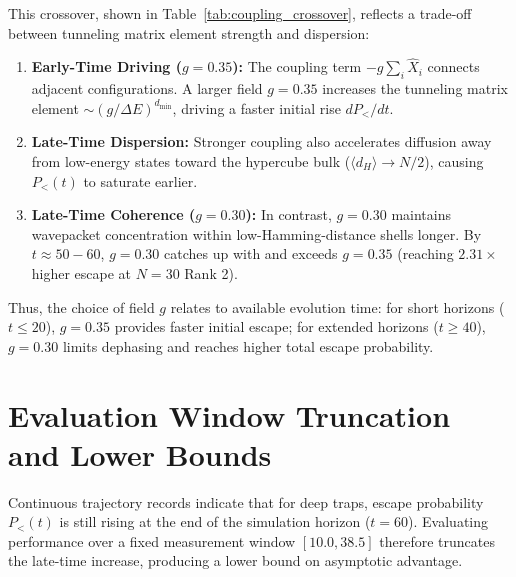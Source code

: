 \documentclass[12pt,a4paper]{report}
\begin{document}
This crossover, shown in Table~\ref{tab:coupling_crossover}, reflects a trade-off between tunneling matrix element strength and dispersion:
\begin{enumerate}
    \item \textbf{Early-Time Driving ($g = 0.35$):} The coupling term $-g \sum_i \hat{X}_i$ connects adjacent configurations. A larger field $g = 0.35$ increases the tunneling matrix element $\sim (g/\Delta E)^{d_{\min}}$, driving a faster initial rise $dP_</dt$.
    \item \textbf{Late-Time Dispersion:} Stronger coupling also accelerates diffusion away from low-energy states toward the hypercube bulk ($\langle d_H \rangle \to N/2$), causing $P_<(t)$ to saturate earlier.
    \item \textbf{Late-Time Coherence ($g = 0.30$):} In contrast, $g = 0.30$ maintains wavepacket concentration within low-Hamming-distance shells longer. By $t \approx 50 - 60$, $g = 0.30$ catches up with and exceeds $g = 0.35$ (reaching $2.31\times$ higher escape at $N = 30$ Rank 2).
\end{enumerate}

Thus, the choice of field $g$ relates to available evolution time: for short horizons ($t \le 20$), $g = 0.35$ provides faster initial escape; for extended horizons ($t \ge 40$), $g = 0.30$ limits dephasing and reaches higher total escape probability.

\section{Evaluation Window Truncation and Lower Bounds}
\label{sec:conservative_window}
Continuous trajectory records indicate that for deep traps, escape probability $P_<(t)$ is still rising at the end of the simulation horizon ($t = 60$). Evaluating performance over a fixed measurement window $[10.0, 38.5]$ therefore truncates the late-time increase, producing a lower bound on asymptotic advantage.
\end{document}

